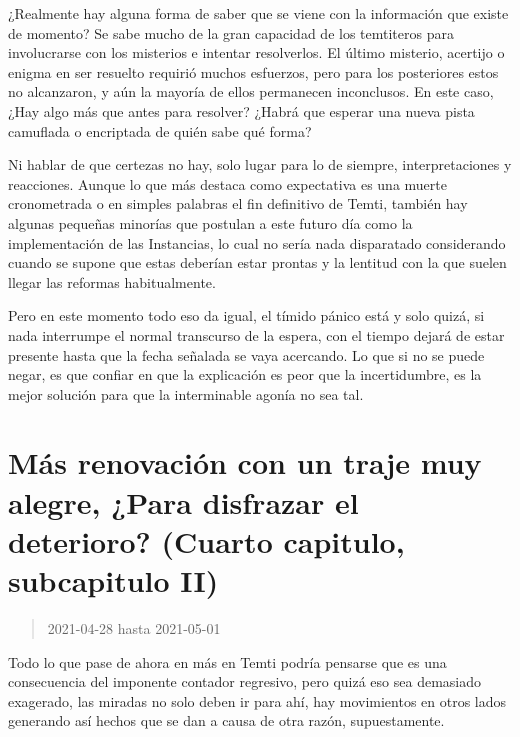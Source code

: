 \documentclass[
  spanish,
]{book}
\begin{document}
¿Realmente hay alguna forma de saber que se viene con la información que existe de momento?
Se sabe mucho de la gran capacidad de los temtiteros para involucrarse con los misterios e intentar resolverlos. El último misterio, acertijo o enigma en ser resuelto requirió muchos esfuerzos, pero para los posteriores estos no alcanzaron, y aún la mayoría de ellos permanecen inconclusos. En este caso, ¿Hay algo más que antes para resolver? ¿Habrá que esperar una nueva pista camuflada o encriptada de quién sabe qué forma?

Ni hablar de que certezas no hay, solo lugar para lo de siempre, interpretaciones y reacciones. Aunque lo que más destaca como expectativa es una muerte cronometrada o en simples palabras el fin definitivo de Temti, también hay algunas pequeñas minorías que postulan a este futuro día como la implementación de las Instancias, lo cual no sería nada disparatado considerando cuando se supone que estas deberían estar prontas y la lentitud con la que suelen llegar las reformas habitualmente.

Pero en este momento todo eso da igual, el tímido pánico está y solo quizá, si nada interrumpe el normal transcurso de la espera, con el tiempo dejará de estar presente hasta que la fecha señalada se vaya acercando. Lo que si no se puede negar, es que confiar en que la explicación es peor que la incertidumbre, es la mejor solución para que la interminable agonía no sea tal.

\hypertarget{muxe1s-renovaciuxf3n-con-un-traje-muy-alegre-para-disfrazar-el-deterioro-cuarto-capitulo-subcapitulo-ii}{%
\section{Más renovación con un traje muy alegre, ¿Para disfrazar el deterioro? (Cuarto capitulo, subcapitulo II)}\label{muxe1s-renovaciuxf3n-con-un-traje-muy-alegre-para-disfrazar-el-deterioro-cuarto-capitulo-subcapitulo-ii}}

\begin{quote}
2021-04-28 hasta 2021-05-01
\end{quote}

Todo lo que pase de ahora en más en Temti podría pensarse que es una consecuencia del imponente contador regresivo, pero quizá eso sea demasiado exagerado, las miradas no solo deben ir para ahí, hay movimientos en otros lados generando así hechos que se dan a causa de otra razón, supuestamente.
\end{document}
